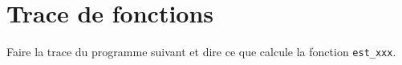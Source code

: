 
\newcommand{\commentaire}[1]{}





\section{Trace de fonctions}

Faire la trace du programme suivant et dire ce que calcule la fonction \verb+est_xxx+.

{
\footnotesize
}


